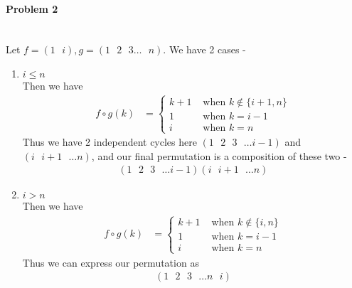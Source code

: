 \documentclass[12pt]{scrartcl}
\begin{document}
\paragraph*{Problem 2 } 
\\ Let $f = (1 \text{ } i), g = (1 \text{ }2 \text{ }3 \ldots \text{ }n)$. We have 2 cases - 
\begin{enumerate}
    \item $i \leq n$
    \\ Then we have 
    \begin{align*}
        f \circ g (k) &= \begin{cases}
            k + 1 &\text{ when } k \notin \{i + 1, n\}
            \\ 1 &\text{ when } k = i - 1
            \\ i &\text{ when } k = n
        \end{cases}
    \end{align*}
    Thus we have 2 independent cycles here $(1 \text{ } 2\text{ } 3\text{ } \ldots i-1)$ and $(i \text{ } i + 1 \text{ } \ldots n)$, and our final permutation is a composition of these two - 
    \begin{align*}
        (1 \text{ } 2\text{ } 3\text{ } \ldots i-1) (i \text{ } i + 1 \text{ } \ldots n)
    \end{align*}
    \item $i > n$
    \\ Then we have 
    \begin{align*}
        f \circ g (k) &= \begin{cases}
            k + 1 &\text{ when } k \notin \{i, n\}
            \\ 1 &\text{ when } k = i - 1
            \\ i &\text{ when } k = n
        \end{cases}
    \end{align*}
    Thus we can express our permutation as 
    \begin{align*}
        (1 \text{ } 2\text{ } 3\text{ } \ldots n \text{ } i)
    \end{align*}
\end{enumerate}
\end{document}
